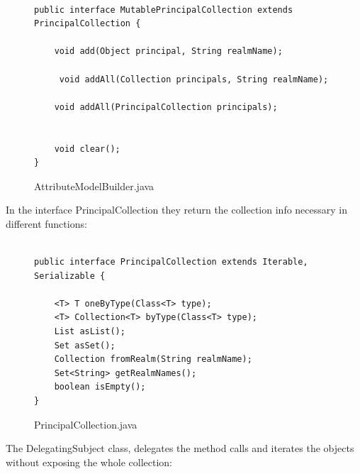 \begin{figure}[!tbp]
\centering
\lstset{language=Java, stepnumber=1, showspaces=false, showstringspaces=false,breaklines=true}
\begin{lstlisting}

public interface MutablePrincipalCollection extends PrincipalCollection {

    void add(Object principal, String realmName);

     void addAll(Collection principals, String realmName);

    void addAll(PrincipalCollection principals);


    void clear();
}
\end{lstlisting}
\caption{AttributeModelBuilder.java}
\label{AttributeModelBuilder}
\end{figure}

In the interface PrincipalCollection they return the collection info necessary in different functions:

\begin{figure}[!tbp]
\centering
\lstset{language=Java, stepnumber=1, showspaces=false, showstringspaces=false,breaklines=true}
\begin{lstlisting}

public interface PrincipalCollection extends Iterable, Serializable {

    <T> T oneByType(Class<T> type);
    <T> Collection<T> byType(Class<T> type);
    List asList();
    Set asSet();
    Collection fromRealm(String realmName);
    Set<String> getRealmNames();
    boolean isEmpty();
}

\end{lstlisting}
\caption{PrincipalCollection.java}
\label{PrincipalCollection}
\end{figure}

The DelegatingSubject class, delegates the method calls and iterates the objects without exposing the whole collection:

